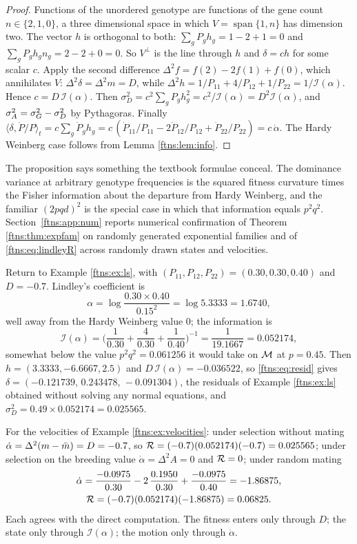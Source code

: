 \begin{proof}
Functions of the unordered genotype are functions of the gene count $n\in\{2,1,0\}$, a three
dimensional space in which $V=\operatorname{span}\{1,n\}$ has dimension two. The vector $h$ is
orthogonal to both: $\sum_gP_gh_g=1-2+1=0$ and $\sum_gP_gh_gn_g=2-2+0=0$. So $V^\perp$ is the line
through $h$ and $\delta=ch$ for some scalar $c$. Apply the second difference
$\Delta^2f=f(2)-2f(1)+f(0)$, which annihilates $V$: $\Delta^2\delta=\Delta^2m=D$, while
$\Delta^2h=1/P_{11}+4/P_{12}+1/P_{22}=1/\mathcal{I}(\alpha)$. Hence $c=D\,\mathcal{I}(\alpha)$. Then
$\sigma^2_D=c^2\sum_gP_gh_g^2=c^2/\mathcal{I}(\alpha)=D^2\mathcal{I}(\alpha)$, and
$\sigma^{2}_{A}=\sigma^2_G-\sigma^2_D$ by Pythagoras. Finally
$\langle\delta,\dot P/P\rangle_t=c\sum_g\dot P_gh_g
=c\,(\dot P_{11}/P_{11}-2\dot P_{12}/P_{12}+\dot P_{22}/P_{22})=c\,\dot\alpha$. The Hardy Weinberg
case follows from Lemma \ref{ftns:lem:info}.
\end{proof}

The proposition says something the textbook formulae conceal. The dominance variance at arbitrary
genotype frequencies is the squared fitness curvature times the Fisher information about the
departure from Hardy Weinberg, and the familiar $(2pqd)^2$ is the special case in which that
information equals $p^2q^2$. Section~\ref{ftns:app:num} reports numerical confirmation of
Theorem \ref{ftns:thm:expfam} on randomly generated exponential families and of
\eqref{ftns:eq:lindleyR} across randomly drawn states and velocities.

\begin{example}
\label{ftns:ex:lindleynum}
Return to Example \ref{ftns:ex:ls}, with $(P_{11},P_{12},P_{22})=(0.30,0.30,0.40)$ and
$D=-0.7$. Lindley's coefficient is
\[
\alpha=\log\frac{0.30\times0.40}{0.15^2}=\log 5.3333=1.6740 ,
\]
well away from the Hardy Weinberg value $0$; the information is
\[
\mathcal{I}(\alpha)=\Big(\frac1{0.30}+\frac4{0.30}+\frac1{0.40}\Big)^{-1}=\frac{1}{19.1667}=0.052174,
\]
somewhat below the value $p^2q^2=0.061256$ it would take on $\mathcal{M}$ at $p=0.45$. Then
$h=(3.3333,-6.6667,2.5)$ and $D\,\mathcal{I}(\alpha)=-0.036522$, so
\eqref{ftns:eq:resid} gives $\delta=(-0.121739,\,0.243478,\,-0.091304)$, the residuals of
Example \ref{ftns:ex:ls} obtained without solving any normal equations, and
$\sigma^2_D=0.49\times0.052174=0.025565$.

For the velocities of Example \ref{ftns:ex:velocities}: under selection without mating
$\dot\alpha=\Delta^2(m-\bar{m})=D=-0.7$, so $\mathcal{R}=(-0.7)(0.052174)(-0.7)=0.025565$; under selection on
the breeding value $\dot\alpha=\Delta^2A=0$ and $\mathcal{R}=0$; under random mating
\begin{gather*}
\dot\alpha=\frac{-0.0975}{0.30}-2\,\frac{0.1950}{0.30}+\frac{-0.0975}{0.40}=-1.86875,\\
\mathcal{R}=(-0.7)(0.052174)(-1.86875)=0.06825 .
\end{gather*}
Each agrees with the direct computation. The fitness enters only through $D$; the state only
through $\mathcal{I}(\alpha)$; the motion only through $\dot\alpha$.
\end{example}

